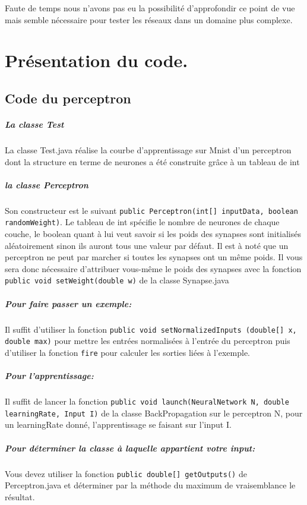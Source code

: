 \documentclass[a4paper,oneside]{report}
\begin{document}
 Faute de temps nous n'avons pas eu la possibilité d'approfondir ce point de vue mais 
semble nécessaire pour tester les réseaux dans un domaine plus complexe.

        \chapter{Présentation du code.}
        
\section{Code du perceptron}

\paragraph*{La classe Test} La classe Test.java réalise la courbe d'apprentissage sur Mnist d'un perceptron dont la structure en terme de neurones a été construite grâce à un tableau de int

\paragraph*{la classe Perceptron} Son constructeur est le suivant \texttt{public Perceptron(int[] inputData, boolean randomWeight)}. Le tableau de int spécifie le nombre de neurones de chaque couche, le boolean quant à lui veut savoir si les poids des synapses sont initialisés aléatoirement sinon ils auront tous une valeur par défaut. Il est à noté que un perceptron ne peut par marcher si toutes les synapses ont un même poids. Il vous sera donc nécessaire d'attribuer vous-même le poids des synapses avec la fonction \texttt{public void setWeight(double w)} de la classe Synapse.java

\paragraph*{Pour faire passer un exemple:} Il suffit d'utiliser la fonction \texttt{public void setNormalizedInputs (double[] x, double max)} pour mettre les entrées normalisées à l'entrée du perceptron puis d'utiliser la fonction \texttt{fire} pour calculer les sorties liées à l'exemple.

\paragraph*{Pour l'apprentissage: } Il suffit de lancer la fonction \texttt{public void launch(NeuralNetwork N, double learningRate, Input I)} de la classe BackPropagation sur le perceptron N, pour un learningRate donné, l'apprentissage se faisant sur l'input I.  

\paragraph*{Pour déterminer la classe à laquelle appartient votre input:} Vous devez utiliser la fonction \texttt{public double[] getOutputs()} de Perceptron.java et déterminer par la méthode du maximum de vraisemblance le résultat.
\end{document}
